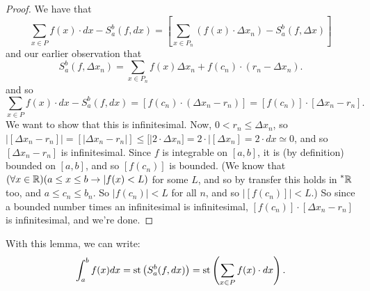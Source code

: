 \begin{proof}
    We have that 
    \[ 
    \sum_{x \in P} f(x) \cdot dx - S_a^b(f, dx) = [\sum_{x \in P_n} \left(f(x) \cdot \Delta x_n\right) - S_a^b(f, \Delta x)]
    \]
    and our earlier observation that
    \[ 
    S_a^b(f, \Delta x_n) = \sum_{x \in P_n} f(x) \Delta x_n + f(c_n) \cdot (r_n - \Delta x_n). 
    \]
    and so 
    \[ 
    \sum_{x \in P} f(x) \cdot dx - S_a^b(f, dx) = [f(c_n) \cdot (\Delta x_n - r_n)] = [f(c_n)] \cdot [\Delta x_n - r_n].
    \]
    We want to show that this is infinitesimal. Now, $0 < r_n \leq \Delta x_n$, so $|[\Delta x_n - r_n]| = [|\Delta x_n - r_n|] \leq [|2 \cdot \Delta x_n] = 2 \cdot |[\Delta x_n] = 2 \cdot dx \simeq 0$, and so $[\Delta x_n - r_n]$ is infinitesimal. Since $f$ is integrable on $[a, b]$, it is (by definition) bounded on $[a, b]$, and so $[f(c_n)]$ is bounded. (We know that $(\forall x \in \mathbb{R})(a \leq x \leq b \to |f(x) < L)$ for some $L$, and so by transfer this holds in $\prescript{*}{}{\mathbb{R}}$ too, and $a \leq c_n \leq b_n$. So $|f(c_n)| < L$ for all $n$, and so $|[f(c_n)]| < L$.) So since a bounded number times an infinitesimal is infinitesimal, $[f(c_n)] \cdot [\Delta x_n - r_n]$ is infinitesimal, and we're done.
\end{proof}

With this lemma, we can write:
\[
\int_a^b f(x)dx = \operatorname{st}\left(S_a^b(f, dx)\right) = \operatorname{st}\left(\sum_{x \in P} f(x) \cdot dx\right).
\]
